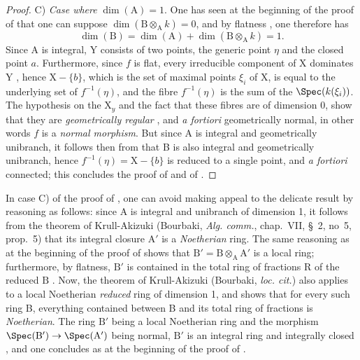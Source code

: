 \begin{proof}
C) \emph{Case where} $\dim(\mathrm{A})=1$.
One has seen at the beginning of the proof of  that one can suppose $\dim(\mathrm{B}\otimes_{\mathrm{A}}k)=0$, and by flatness , one therefore has
\[
  \dim(\mathrm{B})=\dim(\mathrm{A})+\dim(\mathrm{B}\otimes_{\mathrm{A}}k)=1.
\]
Since A is integral, Y consists of two points, the generic point $\eta$ and the closed point $a$.
Furthermore, since $f$ is flat, every irreducible component of X dominates Y , hence $\mathrm{X}-\{b\}$, which is the set of maximal points $\xi_i$ of X, is equal to
the underlying set of $f^{-1}(\eta)$, and the fibre $f^{-1}(\eta)$ is the sum of the $\Spec(k(\xi_i))$.
The hypothesis on the $\mathrm{X}_y$ and the fact that these fibres are of dimension 0, show that they are \emph{geometrically regular} , and \emph{a fortiori} geometrically normal, in other words $f$ is a \emph{normal morphism}.
But since A is integral and geometrically unibranch, it follows then from  that B is also integral and geometrically unibranch, hence $f^{-1}(\eta)=\mathrm{X}-\{b\}$ is reduced to a single point, and \emph{a fortiori} connected;
this concludes the proof of  and of .
\end{proof}

\begin{remark}[18.9.7.8]
\label{IV.18.9.7.8}
In case C) of the proof of , one can avoid making appeal to the delicate result  by reasoning as follows:
since A is integral and unibranch of dimension 1, it follows from the theorem of Krull-Akizuki (Bourbaki, \emph{Alg. comm.}, chap.~VII, \S~2, no~5, prop.~5) that its integral closure $\mathrm{A}'$ is a \emph{Noetherian} ring.
The same reasoning as at the beginning of the proof of  shows that $\mathrm{B}'=\mathrm{B}\otimes_{\mathrm{A}}\mathrm{A}'$ is a local ring;
furthermore, by flatness, $\mathrm{B}'$ is contained in the total ring of fractions R of the reduced $\mathrm{B}$ .
Now, the theorem of Krull-Akizuki (Bourbaki, \emph{loc. cit.}) also applies to a local Noetherian \emph{reduced} ring of dimension 1, and shows that for every such ring B, everything contained between B and its total ring of fractions is \emph{Noetherian}.
The ring $\mathrm{B}'$ being a local Noetherian ring and the morphism $\Spec(\mathrm{B}')\to\Spec(\mathrm{A}')$ being normal, $\mathrm{B}'$ is an integral ring and integrally closed , and one concludes as at the beginning of the proof of .
\end{remark}

